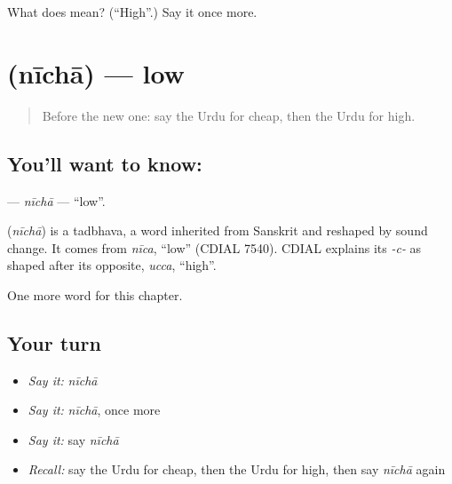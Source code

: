 \begin{tcolorbox}[breakable,colback=teal!4,colframe=teal!35!black,title={Before you move on}]
What does  mean? (\textquotedblleft{}High\textquotedblright{}.) Say it once more.
\end{tcolorbox}
\section[\texorpdfstring{\ur{نیچا} (nīchā)}{نیچا (nīchā)}]{ (nīchā) — low}

\label{lesson:UR-C72-nicha}



\begin{quote}
Before the new one: say the Urdu for cheap, then the Urdu for high.
\end{quote}

\subsection*{You'll want to know: }
\textbf{} — \emph{nīchā} — \textquotedblleft{}low\textquotedblright{}.

\begin{cousinweb}
\textbf{} (\emph{nīchā}) is a tadbhava, a word inherited from Sanskrit and reshaped by sound change. It comes from \emph{nīca}, \textquotedblleft{}low\textquotedblright{} (CDIAL 7540). CDIAL explains its \emph{-c-} as shaped after its opposite, \emph{ucca}, \textquotedblleft{}high\textquotedblright{}.
\end{cousinweb}

\begin{grammarlens}[title={What you've built}]
One more word for this chapter.
\end{grammarlens}

\subsection*{Your turn}
\begin{itemize}
\raggedright
  \item \emph{Say it:} \emph{nīchā}
  \item \emph{Say it:} \emph{nīchā}, once more
  \item \emph{Say it:} say \emph{nīchā}
  \item \emph{Recall:} say the Urdu for cheap, then the Urdu for high, then say \emph{nīchā} again
\end{itemize}

